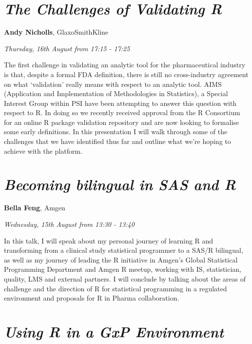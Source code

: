\documentclass[]{book}
\theoremstyle{definition}
\theoremstyle{definition}
\theoremstyle{definition}
\theoremstyle{remark}
\begin{document}
\hypertarget{the-challenges-of-validating-r}{%
\section{\texorpdfstring{\emph{The Challenges of Validating
R}}{The Challenges of Validating R}}\label{the-challenges-of-validating-r}}

\textbf{Andy Nicholls}, GlaxoSmithKline

\emph{Thursday, 16th August from 17:15 - 17:25}

The first challenge in validating an analytic tool for the
pharmaceutical industry is that, despite a formal FDA definition, there
is still no cross-industry agreement on what `validation' really means
with respect to an analytic tool. AIMS (Application and Implementation
of Methodologies in Statistics), a Special Interest Group within PSI
have been attempting to answer this question with respect to R. In doing
so we recently received approval from the R Consortium for an online R
package validation repository and are now looking to formalise some
early definitions. In this presentation I will walk through some of the
challenges that we have identified thus far and outline what we're
hoping to achieve with the platform.

\hypertarget{becoming-bilingual-in-sas-and-r}{%
\section{\texorpdfstring{\emph{Becoming bilingual in SAS and
R}}{Becoming bilingual in SAS and R}}\label{becoming-bilingual-in-sas-and-r}}

\textbf{Bella Feng}, Amgen

\emph{Wednesday, 15th August from 13:30 - 13:40}

In this talk, I will speak about my personal journey of learning R and
transforming from a clinical study statistical programmer to a SAS/R
bilingual, as well as my journey of leading the R initiative in Amgen's
Global Statistical Programming Department and Amgen R meetup, working
with IS, statistician, quality, LMS and external partners. I will
conclude by talking about the areas of challenge and the direction of R
for statistical programming in a regulated environment and proposals for
R in Pharma collaboration.

\hypertarget{using-r-in-a-gxp-environment}{%
\section{\texorpdfstring{\emph{Using R in a GxP
Environment}}{Using R in a GxP Environment}}\label{using-r-in-a-gxp-environment}}
\end{document}
